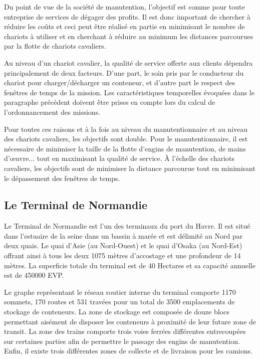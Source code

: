 Du point de vue de la société de manutention, l'objectif est comme pour toute entreprise de services de dégager des profits.
Il est donc important de chercher à réduire les coûts et ceci peut être réalisé en partie en minimisant le nombre de chariots à utiliser et en cherchant à réduire au minimum les distances parcourues par la flotte de chariots cavaliers.

Au niveau d'un chariot cavalier, la qualité de service offerte aux clients dépendra principalement de deux facteurs. D'une part, le soin pris par le conducteur du chariot pour charger/décharger un conteneur, et d'autre part le respect des fenêtres de temps de la mission. Les caractéristiques temporelles évoquées dans le paragraphe précédent doivent être prises en compte lors du calcul de l'ordonnancement des missions.

Pour toutes ces raisons et à la fois au niveau du manutentionnaire et au niveau des chariots cavaliers, les objectifs sont double. Pour le manutentionnaire, il est nécessaire de minimiser la taille de la flotte d'engins de manutention, de mains d’œuvre... tout en maximisant la qualité de service. À l'échelle des chariots cavaliers, les objectifs sont de minimiser la distance parcourue tout en minimisant le dépassement des fenêtres de temps.

\subsection{Le Terminal de Normandie}

Le Terminal de Normandie est l'un des terminaux du port du Havre. 
Il est situé dans l'estuaire de la seine dans un bassin à marée et est délimité au Nord par deux quais. Le quai d'Asie (au Nord-Ouest) et le quai d'Osaka (au Nord-Est) offrant ainsi à tous les deux 1075 mètres d'accostage et une profondeur de 14 mètres.
La superficie totale du terminal est de 40 Hectares et sa capacité annuelle est de 450000 EVP.


Le graphe représentant le réseau routier interne du terminal comporte 1170 sommets, 170 routes et 531 travées pour un total de 3500 emplacements de stockage de conteneurs. La zone de stockage est composée de douze blocs permettant aisément de disposer les conteneurs à proximité de leur future zone de transit. La zone des trains comporte trois voies ferrées différentes entrecoupées sur certaines parties afin de permettre le passage des engins de manutention. Enfin, il existe trois différentes zones de collecte et de livraison pour les camions.

